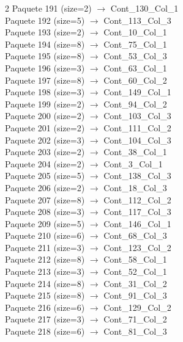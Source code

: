 \begin{multicols}{2}
Paquete 191 (size=2) $\rightarrow$ Cont\_130\_Col\_1\\
Paquete 192 (size=5) $\rightarrow$ Cont\_113\_Col\_3\\
Paquete 193 (size=2) $\rightarrow$ Cont\_10\_Col\_1\\
Paquete 194 (size=8) $\rightarrow$ Cont\_75\_Col\_1\\
Paquete 195 (size=8) $\rightarrow$ Cont\_53\_Col\_3\\
Paquete 196 (size=3) $\rightarrow$ Cont\_63\_Col\_1\\
Paquete 197 (size=8) $\rightarrow$ Cont\_60\_Col\_2\\
Paquete 198 (size=3) $\rightarrow$ Cont\_149\_Col\_1\\
Paquete 199 (size=2) $\rightarrow$ Cont\_94\_Col\_2\\
Paquete 200 (size=2) $\rightarrow$ Cont\_103\_Col\_3\\
Paquete 201 (size=2) $\rightarrow$ Cont\_111\_Col\_2\\
Paquete 202 (size=3) $\rightarrow$ Cont\_104\_Col\_3\\
Paquete 203 (size=2) $\rightarrow$ Cont\_38\_Col\_1\\
Paquete 204 (size=2) $\rightarrow$ Cont\_3\_Col\_1\\
Paquete 205 (size=5) $\rightarrow$ Cont\_138\_Col\_3\\
Paquete 206 (size=2) $\rightarrow$ Cont\_18\_Col\_3\\
Paquete 207 (size=8) $\rightarrow$ Cont\_112\_Col\_2\\
Paquete 208 (size=3) $\rightarrow$ Cont\_117\_Col\_3\\
Paquete 209 (size=5) $\rightarrow$ Cont\_146\_Col\_1\\
Paquete 210 (size=6) $\rightarrow$ Cont\_68\_Col\_3\\
Paquete 211 (size=3) $\rightarrow$ Cont\_123\_Col\_2\\
Paquete 212 (size=8) $\rightarrow$ Cont\_58\_Col\_1\\
Paquete 213 (size=3) $\rightarrow$ Cont\_52\_Col\_1\\
Paquete 214 (size=8) $\rightarrow$ Cont\_31\_Col\_2\\
Paquete 215 (size=8) $\rightarrow$ Cont\_91\_Col\_3\\
Paquete 216 (size=6) $\rightarrow$ Cont\_129\_Col\_2\\
Paquete 217 (size=3) $\rightarrow$ Cont\_71\_Col\_2\\
Paquete 218 (size=6) $\rightarrow$ Cont\_81\_Col\_3\\

\end{multicols}
